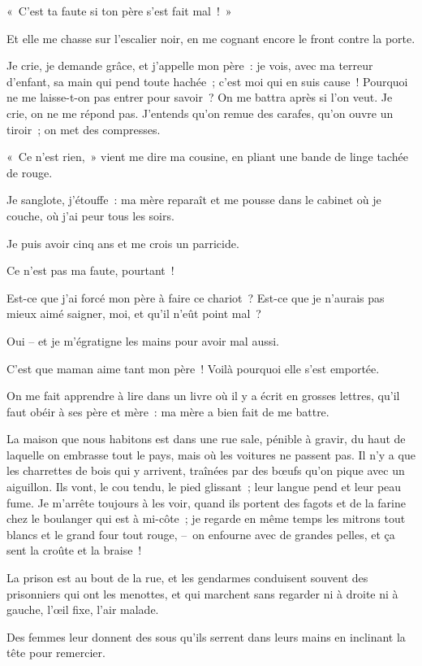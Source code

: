 \documentclass[french,twoside]{book} %
\begin{document}
« C’est ta faute si ton père s’est fait mal ! »\par
Et elle me chasse sur l’escalier noir, en me cognant encore le front contre la porte.\par
Je crie, je demande grâce, et j’appelle mon père : je vois, avec ma terreur d’enfant, sa main qui pend toute hachée ; c’est moi qui en suis cause ! Pourquoi ne me laisse-t-on pas entrer pour savoir ? On me battra après si l’on veut. Je crie, on ne me répond pas. J’entends qu’on remue des carafes, qu’on ouvre un tiroir ; on met des compresses.\par
« Ce n’est rien, » vient me dire ma cousine, en pliant une bande de linge tachée de rouge.\par
Je sanglote, j’étouffe : ma mère reparaît et me pousse dans le cabinet où je couche, où j’ai peur tous les soirs.\par
Je puis avoir cinq ans et me crois un parricide.\par
Ce n’est pas ma faute, pourtant !\par
Est-ce que j’ai forcé mon père à faire ce chariot ? Est-ce que je n’aurais pas mieux aimé saigner, moi, et qu’il n’eût point mal ?\par
Oui – et je m’égratigne les mains pour avoir mal aussi.\par
C’est que maman aime tant mon père ! Voilà pourquoi elle s’est emportée.\par
On me fait apprendre à lire dans un livre où il y a écrit en grosses lettres, qu’il faut obéir à ses père et mère : ma mère a bien fait de me battre.\par
\bigbreak
\noindent La maison que nous habitons est dans une rue sale, pénible à gravir, du haut de laquelle on embrasse tout le pays, mais où les voitures ne passent pas. Il n’y a que les charrettes de bois qui y arrivent, traînées par des bœufs qu’on pique avec un aiguillon. Ils vont, le cou tendu, le pied glissant ; leur langue pend et leur peau fume. Je m’arrête toujours à les voir, quand ils portent des fagots et de la farine chez le boulanger qui est à mi-côte ; je regarde en même temps les mitrons tout blancs et le grand four tout rouge, – on enfourne avec de grandes pelles, et ça sent la croûte et la braise !\par
\bigbreak
\noindent La prison est au bout de la rue, et les gendarmes conduisent souvent des prisonniers qui ont les menottes, et qui marchent sans regarder ni à droite ni à gauche, l’œil fixe, l’air malade.\par
Des femmes leur donnent des sous qu’ils serrent dans leurs mains en inclinant la tête pour remercier.\par
\end{document}
